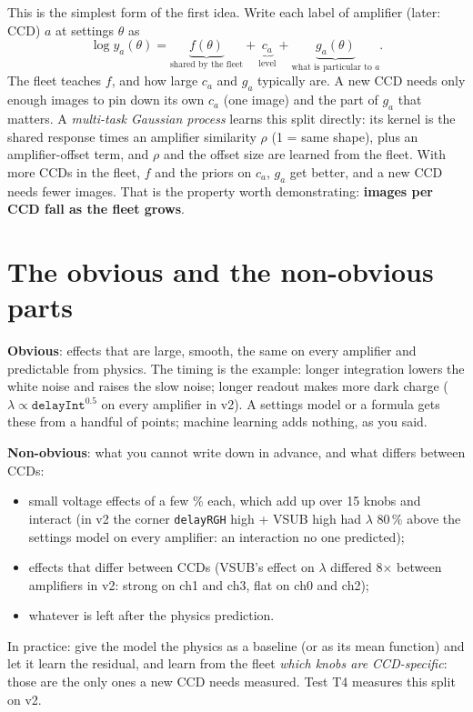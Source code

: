 \documentclass[11pt]{article}
\begin{document}
This is the simplest form of the first idea. Write each label of amplifier (later: CCD) $a$ at settings $\theta$ as
\[
\log y_a(\theta) = \underbrace{f(\theta)}_{\text{shared by the fleet}} + \underbrace{c_a}_{\text{level}} +
\underbrace{g_a(\theta)}_{\text{what is particular to } a}.
\]
The fleet teaches $f$, and how large $c_a$ and $g_a$ typically are. A new CCD needs only enough images to pin down its own
$c_a$ (one image) and the part of $g_a$ that matters. A \emph{multi-task Gaussian process} learns this split directly:
its kernel is the shared response times an amplifier similarity $\rho$ (1 = same shape), plus an amplifier-offset term,
and $\rho$ and the offset size are learned from the fleet. With more CCDs in the fleet, $f$ and the priors on $c_a$,
$g_a$ get better, and a new CCD needs fewer images. That is the property worth demonstrating: \textbf{images per CCD fall
as the fleet grows}.

\section{The obvious and the non-obvious parts}
\textbf{Obvious}: effects that are large, smooth, the same on every amplifier and predictable from physics. The timing is
the example: longer integration lowers the white noise and raises the slow noise; longer readout makes more dark charge
($\lambda \propto \texttt{delayInt}^{0.5}$ on every amplifier in v2). A settings model or a formula gets these from a handful
of points; machine learning adds nothing, as you said.

\textbf{Non-obvious}: what you cannot write down in advance, and what differs between CCDs:
\begin{itemize}
\item small voltage effects of a few \% each, which add up over 15 knobs and interact (in v2 the corner
  \texttt{delayRGH} high + VSUB high had $\lambda$ 80\,\% above the settings model on every amplifier: an interaction no
  one predicted);
\item effects that differ between CCDs (VSUB's effect on $\lambda$ differed 8$\times$ between amplifiers in v2: strong on
  ch1 and ch3, flat on ch0 and ch2);
\item whatever is left after the physics prediction.
\end{itemize}
In practice: give the model the physics as a baseline (or as its mean function) and let it learn the residual, and learn
from the fleet \emph{which knobs are CCD-specific}: those are the only ones a new CCD needs measured. Test T4 measures
this split on v2.
\end{document}
